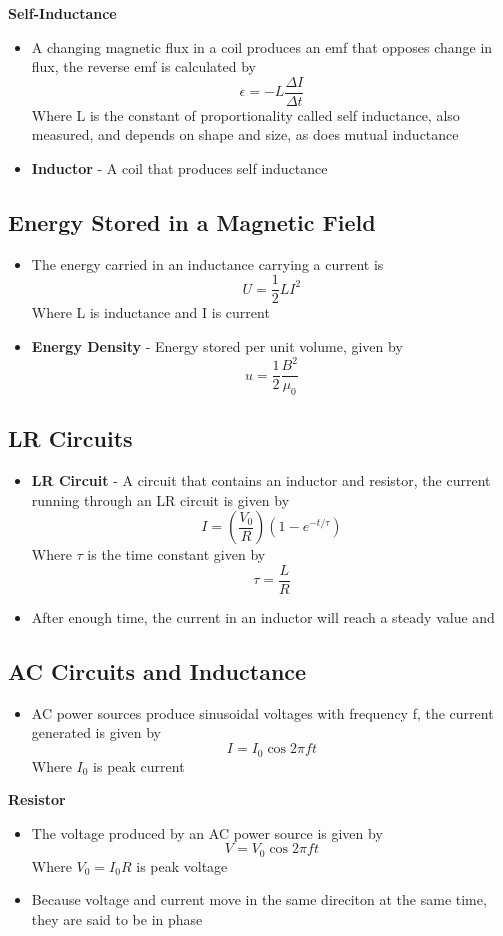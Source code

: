 \textbf{Self-Inductance}
\begin{itemize}
    \item A changing magnetic flux in a coil produces an emf that opposes change in flux, the reverse emf is calculated by \[\epsilon=-L\frac{\Delta I}{\Delta t}\] Where L is the constant of proportionality called self inductance, also measured, and depends on shape and size, as does mutual inductance
    \item \textbf{Inductor} - A coil that produces self inductance
\end{itemize}

\subsection{Energy Stored in a Magnetic Field}
\begin{itemize}
    \item The energy carried in an inductance carrying a current is \[U=\frac{1}{2}LI^2\] Where L is inductance and I is current
    \item \textbf{Energy Density} - Energy stored per unit volume, given by \[u=\frac{1}{2}\frac{B^2}{\mu_0}\] 
\end{itemize}

\subsection{LR Circuits}
\begin{itemize}
    \item \textbf{LR Circuit} - A circuit that contains an inductor and resistor, the current running through an LR circuit is given by \[I=(\frac{V_0}{R})(1-e^{-t/\tau})\] Where \(\tau\) is the time constant given by \[\tau=\frac{L}{R}\]
    \item After enough time, the current in an inductor will reach a steady value and 
\end{itemize}

\subsection{AC Circuits and Inductance}
\begin{itemize}
    \item AC power sources produce sinusoidal voltages with frequency f, the current generated is given by \[I=I_0\cos{2\pi}ft\] Where \(I_0\) is peak current
\end{itemize}

\textbf{Resistor}
\begin{itemize}
    \item The voltage produced by an AC power source is given by \[V=V_0\cos 2\pi ft\]
    Where \(V_0=I_0R\) is peak voltage 
    \item Because voltage and current move in the same direciton at the same time, they are said to be in phase
\end{itemize}

